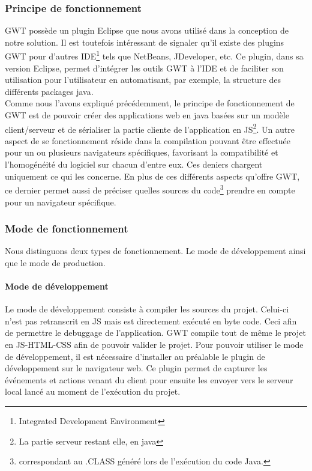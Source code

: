 \subsubsection{Principe de fonctionnement}

GWT possède un plugin Eclipse que nous avons utilisé dans la conception de notre solution. Il est toutefois intéressant de signaler qu'il existe des plugins GWT pour d'autres IDE\footnote{Integrated Development Environment} tels que NetBeans, JDeveloper, etc. 
Ce plugin, dans sa version Eclipse, permet d'intégrer les outils GWT à l'IDE et de faciliter son utilisation pour l'utilisateur en automatisant, par exemple, la structure des différents packages java.\\
\newline
\indent
Comme nous l'avons expliqué précédemment, le principe de fonctionnement de GWT est de pouvoir créer des applications web en java basées sur un modèle client/serveur et de sérialiser la partie cliente de l'application en JS\footnote{La partie serveur restant elle, en java}. Un autre aspect de se fonctionnement réside dans la compilation pouvant être effectuée pour un ou plusieurs navigateurs spécifiques, favorisant la compatibilité et l'homogénéité du logiciel sur chacun d'entre eux. Ces deniers chargent uniquement ce qui les concerne. En plus de ces différents aspects qu'offre GWT, ce dernier permet aussi de préciser quelles sources du code\footnote{correspondant au .CLASS généré lors de l'exécution du code Java.} prendre en compte pour un navigateur spécifique.

\subsubsection{Mode de fonctionnement}
Nous distinguons deux types de fonctionnement. Le mode de développement ainsi que le mode de production.
	
\paragraph{Mode de développement}
Le mode de développement consiste à compiler les sources du projet. Celui-ci n'est pas retranscrit en JS mais est directement exécuté en byte code. Ceci afin de permettre le debuggage de l'application. GWT compile tout de même le projet en JS-HTML-CSS afin de pouvoir valider le projet.
\newline
\indent
Pour pouvoir utiliser le mode de développement, il est nécessaire d'installer au préalable le plugin de développement sur le navigateur web. Ce plugin permet de capturer les événements et actions venant du client pour ensuite les envoyer vers le serveur local lancé au moment de l'exécution du projet.

